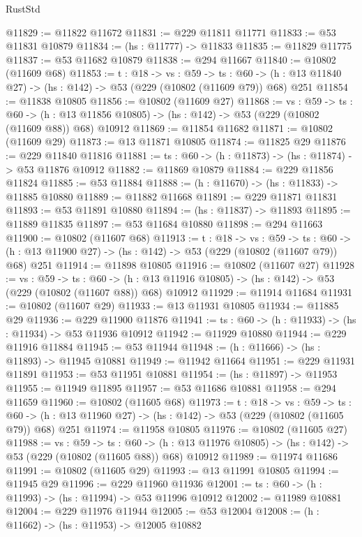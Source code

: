 \begin{lexlean}{RustStd}
\begin{coremodule}
@11829 := @11822 @11672
@11831 := @229 @11811 @11771
@11833 := @53 @11831 @10879
@11834 := (hs : @11777) -> @11833
@11835 := @11829 @11775
@11837 := @53 @11682 @10879
@11838 := @294 @11667
@11840 := @10802 (@11609 @68)
@11853 := {t : @18} ->
  {vs : @59} ->
  {ts : @60} -> (h : @13 @11840 @27) -> (hs : @142) -> @53 (@229 (@10802 (@11609 @79)) @68) @251
@11854 := @11838 @10805
@11856 := @10802 (@11609 @27)
@11868 := {vs : @59} ->
  {ts : @60} ->
  (h : @13 @11856 @10805) -> (hs : @142) -> @53 (@229 (@10802 (@11609 @88)) @68) @10912
@11869 := @11854 @11682
@11871 := @10802 (@11609 @29)
@11873 := @13 @11871 @10805
@11874 := @11825 @29
@11876 := @229 @11840 @11816
@11881 := {ts : @60} -> (h : @11873) -> (hs : @11874) -> @53 @11876 @10912
@11882 := @11869 @10879
@11884 := @229 @11856 @11824
@11885 := @53 @11884
@11888 := (h : @11670) -> (hs : @11833) -> @11885 @10880
@11889 := @11882 @11668
@11891 := @229 @11871 @11831
@11893 := @53 @11891 @10880
@11894 := (hs : @11837) -> @11893
@11895 := @11889 @11835
@11897 := @53 @11684 @10880
@11898 := @294 @11663
@11900 := @10802 (@11607 @68)
@11913 := {t : @18} ->
  {vs : @59} ->
  {ts : @60} -> (h : @13 @11900 @27) -> (hs : @142) -> @53 (@229 (@10802 (@11607 @79)) @68) @251
@11914 := @11898 @10805
@11916 := @10802 (@11607 @27)
@11928 := {vs : @59} ->
  {ts : @60} ->
  (h : @13 @11916 @10805) -> (hs : @142) -> @53 (@229 (@10802 (@11607 @88)) @68) @10912
@11929 := @11914 @11684
@11931 := @10802 (@11607 @29)
@11933 := @13 @11931 @10805
@11934 := @11885 @29
@11936 := @229 @11900 @11876
@11941 := {ts : @60} -> (h : @11933) -> (hs : @11934) -> @53 @11936 @10912
@11942 := @11929 @10880
@11944 := @229 @11916 @11884
@11945 := @53 @11944
@11948 := (h : @11666) -> (hs : @11893) -> @11945 @10881
@11949 := @11942 @11664
@11951 := @229 @11931 @11891
@11953 := @53 @11951 @10881
@11954 := (hs : @11897) -> @11953
@11955 := @11949 @11895
@11957 := @53 @11686 @10881
@11958 := @294 @11659
@11960 := @10802 (@11605 @68)
@11973 := {t : @18} ->
  {vs : @59} ->
  {ts : @60} -> (h : @13 @11960 @27) -> (hs : @142) -> @53 (@229 (@10802 (@11605 @79)) @68) @251
@11974 := @11958 @10805
@11976 := @10802 (@11605 @27)
@11988 := {vs : @59} ->
  {ts : @60} ->
  (h : @13 @11976 @10805) -> (hs : @142) -> @53 (@229 (@10802 (@11605 @88)) @68) @10912
@11989 := @11974 @11686
@11991 := @10802 (@11605 @29)
@11993 := @13 @11991 @10805
@11994 := @11945 @29
@11996 := @229 @11960 @11936
@12001 := {ts : @60} -> (h : @11993) -> (hs : @11994) -> @53 @11996 @10912
@12002 := @11989 @10881
@12004 := @229 @11976 @11944
@12005 := @53 @12004
@12008 := (h : @11662) -> (hs : @11953) -> @12005 @10882

\end{coremodule}
\end{lexlean}
